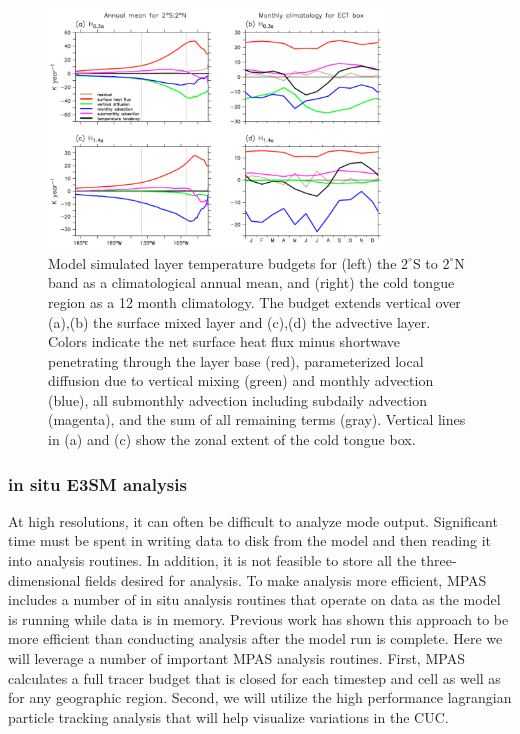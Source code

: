 \begin{figure}[h]
  \centering
  \includegraphics[width=0.8\textwidth]{heatbudget.pdf}
  \caption{Model simulated layer temperature budgets for (left) the $2^\circ$S to $2^\circ$N band as a climatological annual mean, and (right) the cold tongue region as a 12 month climatology.  The budget extends vertical over (a),(b) the surface mixed layer and (c),(d) the advective layer.  Colors indicate the net surface heat flux minus shortwave penetrating through the layer base (red), parameterized local diffusion due to vertical mixing (green) and monthly advection (blue), all submonthly advection including subdaily advection (magenta), and the sum of all remaining terms (gray).  Vertical lines in (a) and (c) show the zonal extent of the cold tongue box.}
  \label{fig:heatBudget}
\end{figure}

\subsubsection{in situ E3SM analysis}
At high resolutions, it can often be difficult to analyze mode output.  Significant time must be spent in writing data to disk from the model and then reading it into analysis routines.  In addition, it is not feasible to store all the three-dimensional fields desired for analysis.  To make analysis more efficient, MPAS includes a number of in situ analysis routines that operate on data as the model is running while data is in memory.  Previous work \citep{woodring2015situ} has shown this approach to be more efficient than conducting analysis after the model run is complete.  Here we will leverage a number of important MPAS analysis routines.  First, MPAS calculates a full tracer budget that is closed for each timestep and cell as well as for any geographic region.  Second, we will utilize the high performance lagrangian particle tracking analysis \citep{wolfram2015diagnosing} that will help visualize variations in the CUC.

